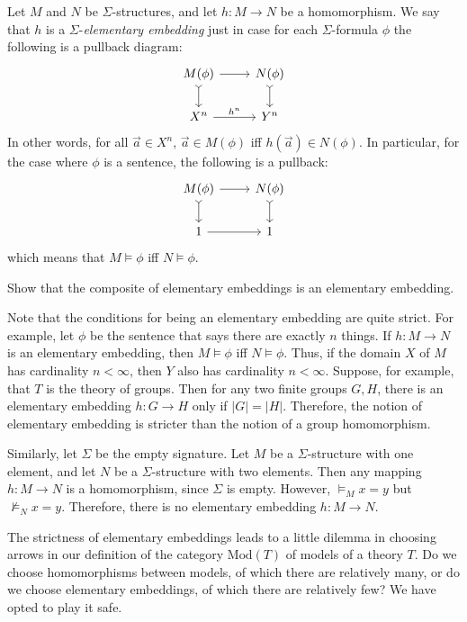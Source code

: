 \begin{defn} \label{elem} Let $M$ and $N$ be $\Sigma$-structures,
  and let $h:M\to N$ be a homomorphism.  We say that $h$ is a
  $\Sigma$-\emph{elementary embedding} just in case for each
  $\Sigma$-formula $\phi$ the following is a pullback diagram:
  \[ \begin{tikzcd} M(\phi ) \arrow{r}{} \arrow[>->]{d}{} & N(\phi )
      \arrow[>->]{d}{}
      \\
      X^n \arrow{r}{h^n} & Y^n \end{tikzcd} \] In other words, for all
  $\vec{a}\in X^n$, $\vec{a}\in M(\phi )$ iff
  $h(\vec{a})\in N(\phi )$.  In particular, for the case where $\phi$
  is a sentence, the following is a pullback:
  \[ \begin{tikzcd} M(\phi ) \arrow{r}{} \arrow[>->]{d}{} & N(\phi )
      \arrow[>->]{d}{}
      \\
      1 \arrow{r}{} & 1 \end{tikzcd} \] which means that
  $M\vDash \phi$ iff $N\vDash\phi$.
\end{defn}

\begin{exercise} Show that the composite of elementary embeddings is
  an elementary embedding. \end{exercise}

Note that the conditions for being an elementary embedding are quite
strict.  For example, let $\phi$ be the sentence that says there are
exactly $n$ things.  If $h:M\to N$ is an elementary embedding, then
$M\vDash\phi$ iff $N\vDash\phi$.  Thus, if the domain $X$ of $M$ has
cardinality $n<\infty$, then $Y$ also has cardinality $n<\infty$.
Suppose, for example, that $T$ is the theory of groups.  Then for any
two finite groups $G,H$, there is an elementary embedding $h:G\to H$
only if $|G|=|H|$.  Therefore, the notion of elementary embedding is
stricter than the notion of a group homomorphism.

Similarly, let $\Sigma$ be the empty signature.  Let $M$ be a
$\Sigma$-structure with one element, and let $N$ be a
$\Sigma$-structure with two elements.  Then any mapping $h:M\to N$ is
a homomorphism, since $\Sigma$ is empty.  However, $\vDash _Mx=y$ but
$\not\vDash _Nx=y$.  Therefore, there is no elementary embedding
$h:M\to N$.

The strictness of elementary embeddings leads to a little dilemma in
choosing arrows in our definition of the category $\mathrm{Mod}(T)$ of
models of a theory $T$.  Do we choose homomorphisms between models, of
which there are relatively many, or do we choose elementary
embeddings, of which there are relatively few?  We have opted to play
it safe.

